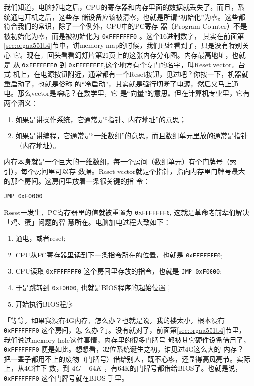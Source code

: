 \documentclass{wx672ctexart}
\begin{document}
我们知道，电脑掉电之后，CPU的寄存器和内存里面的数据就丢失了。而且，系统通电开机之后，这些存
储设备应该被清零，也就是所谓“初始化”为零。这些都符合我们的常识，除了一个例外，CPU中的PC寄存
器（Program Counter）不是被初始化为零，而是被初始化为 \texttt{0xFFFFFFF0} 。这个16进制数字，
其实在前面第\ref{sec:orgaa551b4}节中，讲memory map的时候，我们已经看到了，只是没有特别关心
它。现在，回头看看幻灯片第26页上的这张内存分布图。内存最高地址，也就是
从 \texttt{0xFFFFFFF0} 到 \texttt{0xFFFFFFFF},这个地方有个专门的名字，叫Reset vector。台式
机上，在电源按钮附近，通常都有一个Reset按钮，见过吧？你按一下，机器就重启动了，也就是俗称
的“冷启动”，其实就是强行切断了电源，然后又马上通电。那么vector是啥呢？在数学里，它
是“向量”的意思。但在计算机专业里，它有两个涵义：
\begin{enumerate}
\item 如果是讲操作系统，它通常是“指针、内存地址”的意思；
\item 如果是讲编程，它通常是“一维数组”的意思，而且数组单元里放的通常是指针（内存地址）。
\end{enumerate}

内存本身就是一个巨大的一维数组，每一个房间（数组单元）有个门牌号（索引），每个房间里可以存
数据。Reset vector就是个指针，指向内存里门牌号最大的那个房间。这房间里放着一条很关键的指
令：

\begin{verbatim}
JMP 0xF0000
\end{verbatim}

Reset一发生，PC寄存器里的值就被重置为 \texttt{0xFFFFFFF0}, 这就是革命老前辈们解决「鸡、蛋」问题的智
慧所在。电脑加电过程大致如下：
\begin{enumerate}
\item 通电，或者reset;
\item CPU从PC寄存器里读到下一条指令所在的位置，也就是 \texttt{0xFFFFFFF0};
\item CPU读取 \texttt{0xFFFFFFF0} 这个房间里存放的指令，也就是 \texttt{JMP 0xF0000};
\item 于是跳转到 \texttt{0xF0000}, 也就是BIOS程序的起始位置；
\item 开始执行BIOS程序
\end{enumerate}

「等等，如果我没有4G内存，怎么办？也就是说，我的楼太小，根本没有 \texttt{0xFFFFFFF0} 这个房间，怎
么办？」。没有就对了，前面第\ref{sec:orgaa551b4}节里，我们说过memory hole这件事情，内存里的很多门牌号
都被其它硬件设备借用了， \texttt{0xFFFFFFF0} 便是如此。想想看，32位系统诞生之初，谁见过4G这么大的
内存？把一辈子都用不上的废物（门牌号）借给别人，既不心疼，还显得高风亮节。实际上，从4G往下
数，到 \(4G-64K\) ，有64K的门牌号都借给BIOS了。也就是说， \texttt{0xFFFFFFF0} 这个门牌号就在BIOS
手里。
\end{document}
